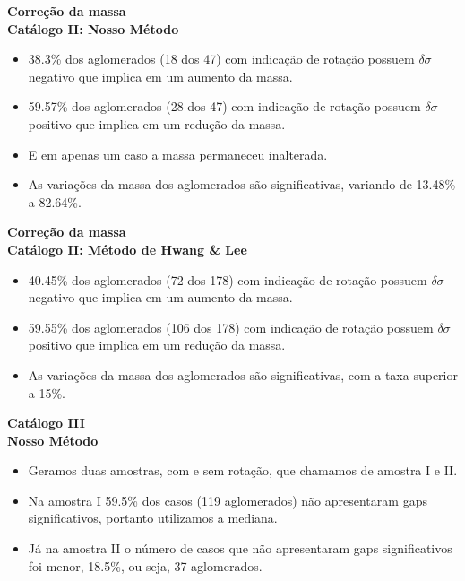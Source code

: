 \documentclass[xcolor=dvipsnames,10pt]{beamer}
\begin{document}
\begin{frame}{\textbf{Correção da massa}}
  \\
  {\textbf{Catálogo II: Nosso Método}}
  \begin{itemize}
    \item 38.3\% dos aglomerados (18 dos 47) com indicação de rotação possuem $\delta \sigma$ negativo que implica em um aumento da massa.
    \item 59.57\% dos aglomerados (28 dos 47) com indicação de rotação possuem $\delta \sigma$ positivo que implica em um redução da massa.
    \item E em apenas um caso a massa permaneceu inalterada.
    \item As variações da massa dos aglomerados são significativas, variando de 13.48\% a 82.64\%.
  \end{itemize}
\end{frame}


\begin{frame}{\textbf{Correção da massa}}
  \\
  {\textbf{Catálogo II: Método de Hwang \& Lee}}
  \begin{itemize}
    \item 40.45\% dos aglomerados (72 dos 178) com indicação de rotação possuem $\delta \sigma$ negativo que implica em um aumento da massa.
    \item 59.55\% dos aglomerados (106 dos 178) com indicação de rotação possuem $\delta \sigma$ positivo que implica em um redução da massa.
    \item As variações da massa dos aglomerados são significativas, com a taxa superior a 15\%.
  \end{itemize}
\end{frame}

\begin{frame}{\textbf{Catálogo III}}
  \\
  {\textbf{Nosso Método}}
  \begin{itemize}
    \item Geramos duas amostras, com e sem rotação, que chamamos de amostra I e II.
    \item Na amostra I 59.5\% dos casos (119 aglomerados) não apresentaram gaps significativos, portanto utilizamos a mediana.
    \item Já na amostra II o número de casos que não apresentaram gaps significativos foi menor, 18.5\%, ou seja, 37 aglomerados.
  \end{itemize}
\end{frame}
\end{document}
